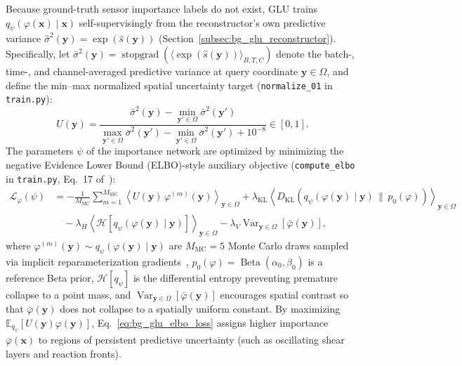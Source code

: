 Because ground-truth sensor importance labels do not exist, GLU trains $q_\psi(\varphi(\mathbf{x}) \mid \mathbf{x})$ self-supervisingly from the reconstructor's own predictive variance $\hat{\sigma}^2(\mathbf{y}) = \exp(\hat{s}(\mathbf{y}))$ (Section~\ref{subsec:bg_glu_reconstructor}). Specifically, let $\bar{\sigma}^2(\mathbf{y}) = \operatorname{stopgrad}\!\left(\langle \exp(\hat{s}(\mathbf{y})) \rangle_{B, T, C}\right)$ denote the batch-, time-, and channel-averaged predictive variance at query coordinate $\mathbf{y} \in \Omega$, and define the min--max normalized spatial uncertainty target (\texttt{normalize\_01} in \texttt{train.py}):
\begin{equation}
    U(\mathbf{y}) = \frac{\bar{\sigma}^2(\mathbf{y}) - \min_{\mathbf{y}' \in \Omega} \bar{\sigma}^2(\mathbf{y}')}{\max_{\mathbf{y}' \in \Omega} \bar{\sigma}^2(\mathbf{y}') - \min_{\mathbf{y}' \in \Omega} \bar{\sigma}^2(\mathbf{y}') + 10^{-8}} \in [0, 1].
    \label{eq:bg_glu_norm_uncert}
\end{equation}
The parameters $\psi$ of the importance network are optimized by minimizing the negative Evidence Lower Bound (ELBO)-style auxiliary objective (\texttt{compute\_elbo} in \texttt{train.py}, Eq.~17 of~\cite{wang2026glu}):
\begin{equation}
\begin{aligned}
    \mathcal{L}_\varphi(\psi) &= -\frac{1}{M_{\text{MC}}}\sum_{m=1}^{M_{\text{MC}}} \left\langle U(\mathbf{y})\, \varphi^{(m)}(\mathbf{y}) \right\rangle_{\mathbf{y} \in \Omega} + \lambda_{\text{KL}} \left\langle D_{\text{KL}}\!\left(q_\psi(\varphi(\mathbf{y}) \mid \mathbf{y}) \,\|\, p_0(\varphi)\right) \right\rangle_{\mathbf{y} \in \Omega} \\
    &\quad - \lambda_H \left\langle \mathcal{H}\!\left[q_\psi(\varphi(\mathbf{y}) \mid \mathbf{y})\right] \right\rangle_{\mathbf{y} \in \Omega} - \lambda_V \operatorname{Var}_{\mathbf{y} \in \Omega}\!\left[\bar{\varphi}(\mathbf{y})\right],
\end{aligned}
\label{eq:bg_glu_elbo_loss}
\end{equation}
where $\varphi^{(m)}(\mathbf{y}) \sim q_\psi(\varphi(\mathbf{y}) \mid \mathbf{y})$ are $M_{\text{MC}} = 5$ Monte Carlo draws sampled via implicit reparameterization gradients~\cite{figurnov2018implicit}, $p_0(\varphi) = \operatorname{Beta}(\alpha_0, \beta_0)$ is a reference Beta prior, $\mathcal{H}[q_\psi]$ is the differential entropy preventing premature collapse to a point mass, and $\operatorname{Var}_{\mathbf{y} \in \Omega}[\bar{\varphi}(\mathbf{y})]$ encourages spatial contrast so that $\bar{\varphi}(\mathbf{y})$ does not collapse to a spatially uniform constant. By maximizing $\mathbb{E}_{q_\psi}[U(\mathbf{y})\varphi(\mathbf{y})]$, Eq.~\eqref{eq:bg_glu_elbo_loss} assigns higher importance $\bar{\varphi}(\mathbf{x})$ to regions of persistent predictive uncertainty (such as oscillating shear layers and reaction fronts).

